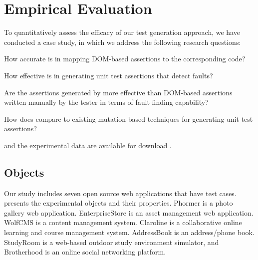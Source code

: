 \section{Empirical Evaluation} \label{Sec:evaluation}
To quantitatively assess the efficacy of our test generation approach, we have conducted a case study, in which we address the following research questions:

\begin{description}[noitemsep]
\item [RQ1] How accurate is \tool in mapping DOM-based assertions to the corresponding \javascript code?
\item [RQ2] How effective is \tool in generating unit test assertions that detect faults?
\item [RQ3] Are the assertions generated by \tool more effective than DOM-based assertions written manually by the tester in terms of fault finding capability? 
\item [RQ4] How does \tool compare to existing mutation-based techniques for generating unit test assertions?
\end{description}

\tool and the experimental data are available for download \cite{atrina-dl}.
\subsection{Objects}
Our study includes seven open source \javascript web applications that have \selenium test cases.
 presents the experimental objects and their properties. Phormer \cite{phormer} is a photo gallery web application. EnterpriseStore \cite{enterpriseStore} is an asset management web application. WolfCMS \cite{wolfcms} is a content management system. Claroline \cite{claroline} is a collaborative online learning and course management system.
AddressBook \cite{addressBook} is an address/phone book. StudyRoom \cite{studyRoom} is a web-based outdoor study environment simulator, and Brotherhood \cite{brotherhood} is an online social networking platform. 

